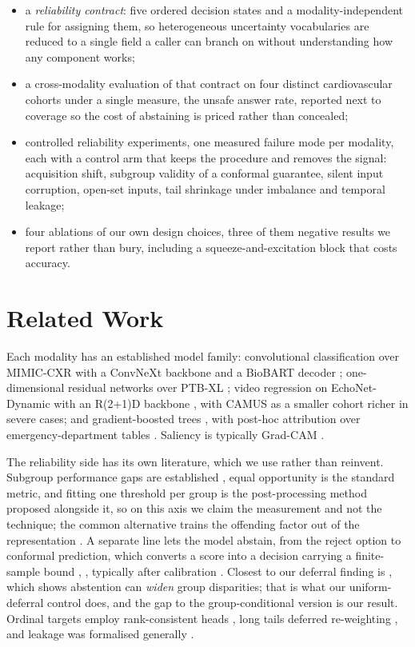 \documentclass[conference,a4paper]{IEEEtran}
\begin{document}
\begin{itemize}
\item a \textit{reliability contract}: five ordered decision states and a modality-independent rule for assigning them, so heterogeneous uncertainty vocabularies are reduced to a single field a caller can branch on without understanding how any component works;
\item a cross-modality evaluation of that contract on four distinct cardiovascular cohorts under a single measure, the unsafe answer rate, reported next to coverage so the cost of abstaining is priced rather than concealed;
\item controlled reliability experiments, one measured failure mode per modality, each with a control arm that keeps the procedure and removes the signal: acquisition shift, subgroup validity of a conformal guarantee, silent input corruption, open-set inputs, tail shrinkage under imbalance and temporal leakage;
\item four ablations of our own design choices, three of them negative results we report rather than bury, including a squeeze-and-excitation block that costs accuracy.
\end{itemize}

\section{Related Work}
Each modality has an established model family: convolutional classification over MIMIC-CXR \cite{ref3} with a ConvNeXt backbone \cite{ref4} and a BioBART decoder \cite{ref5}; one-dimensional residual networks over PTB-XL \cite{ref6}; video regression on EchoNet-Dynamic \cite{ref7} with an R(2+1)D backbone \cite{ref8}, with CAMUS \cite{ref9} as a smaller cohort richer in severe cases; and gradient-boosted trees \cite{ref10}, \cite{ref11} with post-hoc attribution \cite{ref12} over emergency-department tables \cite{ref13}. Saliency is typically Grad-CAM \cite{ref14}.

The reliability side has its own literature, which we use rather than reinvent. Subgroup performance gaps are established \cite{ref15}, equal opportunity \cite{ref16} is the standard metric, and fitting one threshold per group is the post-processing method proposed alongside it, so on this axis we claim the measurement and not the technique; the common alternative trains the offending factor out of the representation \cite{ref17}. A separate line lets the model abstain, from the reject option \cite{ref18} to conformal prediction, which converts a score into a decision carrying a finite-sample bound \cite{ref19}, \cite{ref20}, typically after calibration \cite{ref21}. Closest to our deferral finding is \cite{ref22}, which shows abstention can \textit{widen} group disparities; that is what our uniform-deferral control does, and the gap to the group-conditional version is our result. Ordinal targets employ rank-consistent heads \cite{ref23}, long tails deferred re-weighting \cite{ref24}, and leakage was formalised generally \cite{ref25}.
\end{document}
